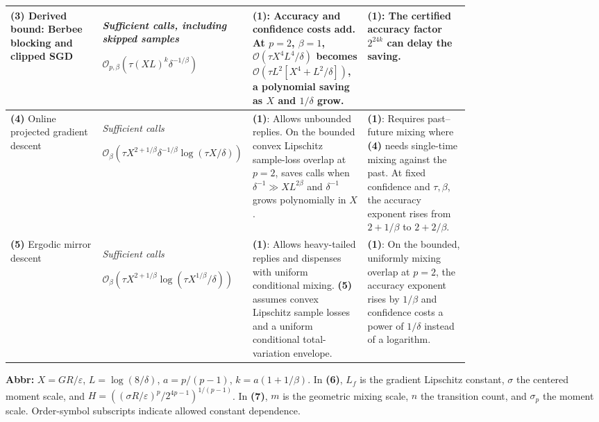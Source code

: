 \begin{table}[tp]
\begin{threeparttable}
\begin{tabularx}{\linewidth}{@{}>{\raggedright\arraybackslash}p{0.20\linewidth}>{\raggedright\arraybackslash}p{0.32\linewidth}>{\raggedright\arraybackslash}p{0.25\linewidth}>{\raggedright\arraybackslash}X@{}}
\midrule[1.2pt]
\textbf{(3)} Derived bound: Berbee blocking and clipped SGD \citep[Thm.~3]{wchLiu2023v3}
& \textit{Sufficient calls, including skipped samples}\par $\mathcal{O}_{p,\beta}\!\left(\tau(XL)^k\delta^{-1/\beta}\right)$
& \textbf{(1)}: Accuracy and confidence costs add. At $p=2$, $\beta=1$, $\mathcal{O}(\tau X^4L^4/\delta)$ becomes $\mathcal{O}(\tau L^2[X^4+L^2/\delta])$, a polynomial saving as $X$ and $1/\delta$ grow.
& \textbf{(1)}: The certified accuracy factor $2^{24k}$ can delay the saving. \\
\midrule
\textbf{(4)} Online projected gradient descent \citep[Thm.~3]{pmsAgarwalDuchiV2}
& \textit{Sufficient calls}\par $\mathcal{O}_{\beta}\!\left(\tau X^{2+1/\beta}\delta^{-1/\beta}\log(\tau X/\delta)\right)$
& \textbf{(1)}: Allows unbounded replies. On the bounded convex Lipschitz sample-loss overlap at $p=2$, saves calls when $\delta^{-1}\gg XL^{2\beta}$ and $\delta^{-1}$ grows polynomially in $X$.
& \textbf{(1)}: Requires past--future mixing where \textbf{(4)} needs single-time mixing against the past. At fixed confidence and $\tau,\beta$, the accuracy exponent rises from $2+1/\beta$ to $2+2/\beta$. \\
\midrule
\textbf{(5)} Ergodic mirror descent \citep[Thm.~2]{htmDuchi2012v3}
& \textit{Sufficient calls}\par $\mathcal{O}_{\beta}\!\left(\tau X^{2+1/\beta}\log(\tau X^{1/\beta}/\delta)\right)$
& \textbf{(1)}: Allows heavy-tailed replies and dispenses with uniform conditional mixing. \textbf{(5)} assumes convex Lipschitz sample losses and a uniform conditional total-variation envelope.
& \textbf{(1)}: On the bounded, uniformly mixing overlap at $p=2$, the accuracy exponent rises by $1/\beta$ and confidence costs a power of $1/\delta$ instead of a logarithm. \\
\bottomrule
\end{tabularx}
\begin{tablenotes}[flushleft]\footnotesize
\item[] \textbf{Abbr:} $X=GR/\varepsilon$, $L=\log(8/\delta)$, $a=p/(p-1)$, $k=a(1+1/\beta)$. In \textbf{(6)}, $L_f$ is the gradient Lipschitz constant, $\sigma$ the centered moment scale, and $H=((\sigma R/\varepsilon)^p/2^{4p-1})^{1/(p-1)}$. In \textbf{(7)}, $m$ is the geometric mixing scale, $n$ the transition count, and $\sigma_p$ the moment scale. Order-symbol subscripts indicate allowed constant dependence.
\end{tablenotes}
\end{threeparttable}
\end{table}
